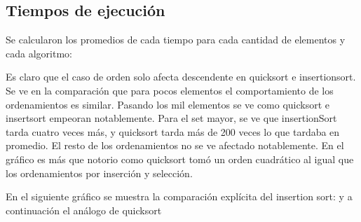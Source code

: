 \documentclass[article,a4paper]{article}
\begin{document}
\subsection{Tiempos de ejecución}

Se calcularon los promedios de cada tiempo para cada cantidad de elementos y cada algoritmo:

  
Es claro que el caso de orden solo afecta descendente en quicksort e insertionsort.
Se ve en la comparación que para pocos elementos el comportamiento de los ordenamientos es similar. Pasando los mil elementos se ve como quicksort e insertsort empeoran notablemente. Para el set mayor, se ve que insertionSort tarda cuatro veces más, y quicksort tarda más de 200 veces lo que tardaba en promedio. El resto de los ordenamientos no se ve afectado notablemente.
En el gráfico es más que notorio como quicksort tomó un orden cuadrático al igual que los ordenamientos por inserción y selección.

En el siguiente gráfico se muestra la comparación explícita del insertion sort:
y a continuación el análogo de quicksort
\end{document}
